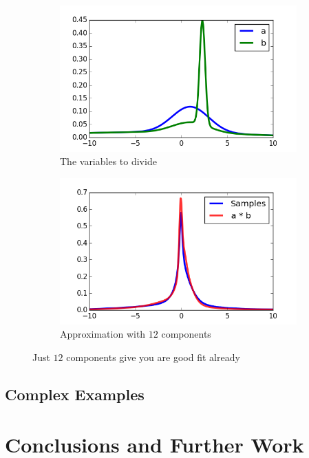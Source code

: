 \documentclass[11pt,a4paper]{book}
\begin{document}
\begin{figure}[h]
  \centering
  \begin{subfigure}[t]{0.45\textwidth}
    \centering
    \includegraphics[width=\textwidth]{thesis/operations/quotient-vars}
    \caption{The variables to divide}
  \end{subfigure}
  \hfill
  \begin{subfigure}[t]{0.45\textwidth}
    \centering
    \includegraphics[width=\textwidth]{thesis/operations/quotient-2-components}
    \caption{Approximation with $12$ components}
  \end{subfigure}
  \caption{Just $12$ components give you are good fit already}
  \label{fig:quotient}
\end{figure}

\section{Complex Examples}

\chapter{Conclusions and Further Work}
\label{ch:conclusions}
\end{document}
